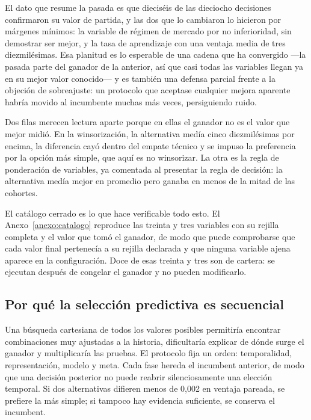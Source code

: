 El dato que resume la pasada es que dieciséis de las dieciocho decisiones confirmaron su
valor de partida, y las dos que lo cambiaron lo hicieron por márgenes mínimos: la variable de
régimen de mercado por no inferioridad, sin demostrar ser mejor, y la tasa de aprendizaje con una
ventaja media de tres diezmilésimas. Esa planitud es lo esperable de una cadena que ha convergido
---la pasada parte del ganador de la anterior, así que casi todas las variables llegan ya en su
mejor valor conocido--- y es también una defensa parcial frente a la objeción de sobreajuste: un
protocolo que aceptase cualquier mejora aparente habría movido al incumbente muchas más veces,
persiguiendo ruido.

Dos filas merecen lectura aparte porque en ellas el ganador no es el valor que mejor midió.
En la winsorización, la alternativa medía cinco diezmilésimas por encima, la diferencia cayó dentro
del empate técnico y se impuso la preferencia por la opción más simple, que aquí es no winsorizar.
La otra es la regla de ponderación de variables, ya comentada al presentar la regla de decisión: la
alternativa medía mejor en promedio pero ganaba en menos de la mitad de las cohortes.

El catálogo cerrado es lo que hace verificable todo esto. El Anexo~\ref{anexo:catalogo} reproduce
las treinta y tres variables con su rejilla completa y el valor que tomó el ganador, de modo que
puede comprobarse que cada valor final pertenecía a su rejilla declarada y que ninguna variable
ajena aparece en la configuración. Doce de esas treinta y tres son de cartera: se ejecutan después
de congelar el ganador y no pueden modificarlo.

\subsection{Por qué la selección predictiva es secuencial}
\label{sec:seleccion-secuencial}

Una búsqueda cartesiana de todos los valores posibles permitiría encontrar combinaciones muy
ajustadas a la historia, dificultaría explicar de dónde surge el ganador y multiplicaría las
pruebas. El protocolo fija un orden: temporalidad, representación, modelo y meta. Cada fase hereda
el incumbent anterior, de modo que una decisión posterior no puede reabrir silenciosamente una
elección temporal. Si dos alternativas difieren menos de 0,002 en ventaja pareada, se prefiere la
más simple; si tampoco hay evidencia suficiente, se conserva el incumbent.

